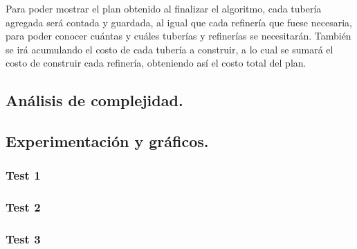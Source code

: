 Para poder mostrar el plan obtenido al finalizar el algoritmo, cada tubería agregada será contada y guardada, al igual que cada refinería que fuese necesaria, para poder conocer cuántas y cuáles tuberías y refinerías se necesitarán.  También se irá acumulando el costo de cada tubería a construir, a lo cual se sumará el costo de construir cada refinería, obteniendo así el costo total del plan.

\vspace*{0.6cm}

\subsection{Análisis de complejidad.}

\vspace*{0.3cm}


\vspace*{0.6cm}

\subsection{Experimentación y gráficos.}

\vspace*{0.3cm}


\subsubsection{Test 1}

\vspace*{0.3cm}


\vspace*{0.6cm}

\subsubsection{Test 2}

\vspace*{0.3cm}


\vspace*{0.6cm}

\subsubsection{Test 3}

\vspace*{0.3cm}

